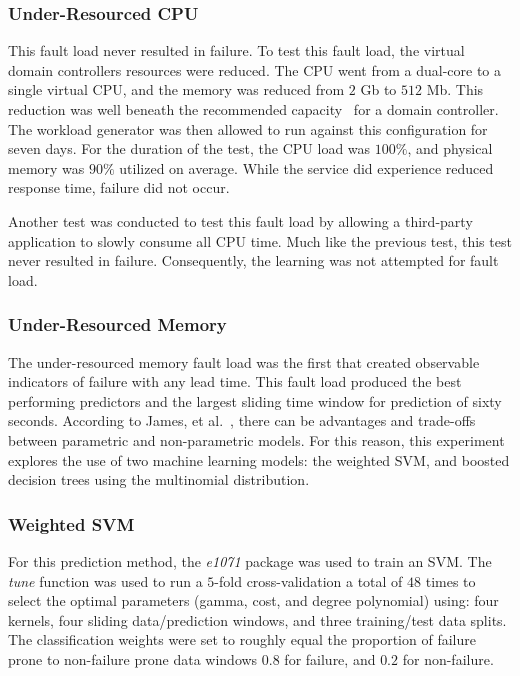 \subsubsection{Under-Resourced \ac{CPU}}
This fault load never resulted in failure.  To test this fault load, the
virtual domain controllers resources were reduced.  The \ac{CPU} went from a
dual-core to a single virtual CPU, and the memory was reduced from $2$ Gb to
$512$ Mb.  This reduction was well beneath the recommended
capacity~\cite{mak12} for a domain controller.  The workload generator was then
allowed to run against this configuration for seven days.  For the duration of
the test, the \ac{CPU} load was $100\%$, and physical memory was $90\%$
utilized on average.  While the service did experience reduced response time,
failure did not occur.

Another test was conducted to test this fault load by allowing a third-party
application to slowly consume all \ac{CPU} time.  Much like the previous test,
this test never resulted in failure.  Consequently, the learning was not
attempted for fault load.

\subsubsection{Under-Resourced Memory}
The under-resourced memory fault load was the first that created observable
indicators of failure with any lead time.  This fault load produced the best
performing predictors and the largest sliding time window for prediction of
sixty seconds.  According to James, et al.~\cite{islr}, there can be advantages
and trade-offs between parametric and non-parametric models.  For this reason,
this experiment explores the use of two machine learning models: the weighted
\ac{SVM}, and boosted decision trees using the multinomial distribution.  

\subsubsection{Weighted \ac{SVM}}
For this prediction method, the \emph{e1071} package was used to train an
\ac{SVM}.  The \emph{tune} function was used to run a $5$-fold cross-validation
a total of $48$ times to select the optimal parameters (gamma, cost, and degree
polynomial) using: four kernels, four sliding data/prediction windows, and
three training/test data splits.  The classification weights were set to
roughly equal the proportion of failure prone to non-failure prone data windows
$0.8$ for failure, and $0.2$ for non-failure.

